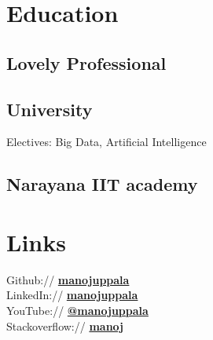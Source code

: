 \documentclass[]{manoj-resume}
\begin{document}
%
%
\lastupdated

%
%

%
%

\begin{minipage}[t]{0.33\textwidth} 


\section{Education} 

\subsection{Lovely Professional}
\subsection{University}
Electives: Big Data, Artificial Intelligence
\sectionsep

\subsection{Narayana IIT academy}


\section{Links} 
Github:// \href{https://github.com/manojuppala}{\bf manojuppala} \\
LinkedIn://  \href{https://www.linkedin.com/in/manojuppala/}{\bf manojuppala} \\
YouTube://  \href{https://youtube.com/@manojuppala}{\bf @manojuppala} \\
Stackoverflow://  \href{https://stackoverflow.com/users/11874811/manoj}{\bf manoj} \\


\end{minipage}
\end{document}
